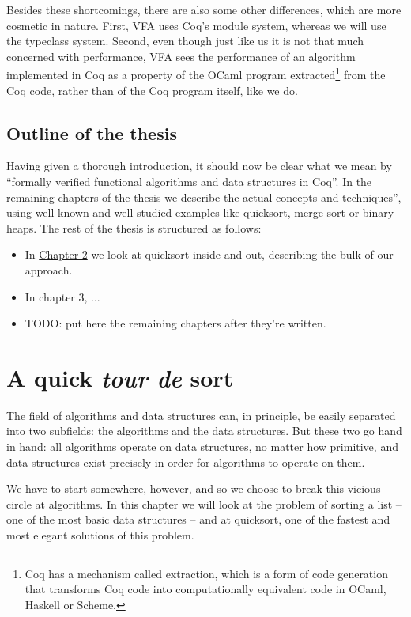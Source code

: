 \documentclass[declaration,mgr,english,shortabstract]{iithesis}
\begin{document}
Besides these shortcomings, there are also some other differences, which are more cosmetic in nature. First, VFA uses Coq's module system, whereas we will use the typeclass system. Second, even though just like us it is not that much concerned with performance, VFA sees the performance of an algorithm implemented in Coq as a property of the OCaml program extracted\footnote{Coq has a mechanism called extraction, which is a form of code generation that transforms Coq code into computationally equivalent code in OCaml, Haskell or Scheme.} from the Coq code, rather than of the Coq program itself, like we do.

\section{Outline of the thesis} \label{outline}

Having given a thorough introduction, it should now be clear what we mean by ``formally verified functional algorithms and data structures in Coq''. In the remaining chapters of the thesis we describe the actual concepts and techniques'', using well-known and well-studied examples like quicksort, merge sort or binary heaps. The rest of the thesis is structured as follows:

\begin{itemize}
    \item In \hyperref[quicksort]{Chapter 2} we look at quicksort inside and out, describing the bulk of our approach.
    \item In chapter 3, ...
    \item TODO: put here the remaining chapters after they're written.
\end{itemize}

\chapter{A quick \textit{tour de} sort} \label{quicksort}

The field of algorithms and data structures can, in principle, be easily separated into two subfields: the algorithms and the data structures. But these two go hand in hand: all algorithms operate on data structures, no matter how primitive, and data structures exist precisely in order for algorithms to operate on them.

We have to start somewhere, however, and so we choose to break this vicious circle at algorithms. In this chapter we will look at the problem of sorting a list -- one of the most basic data structures -- and at quicksort, one of the fastest and most elegant solutions of this problem.
\end{document}
